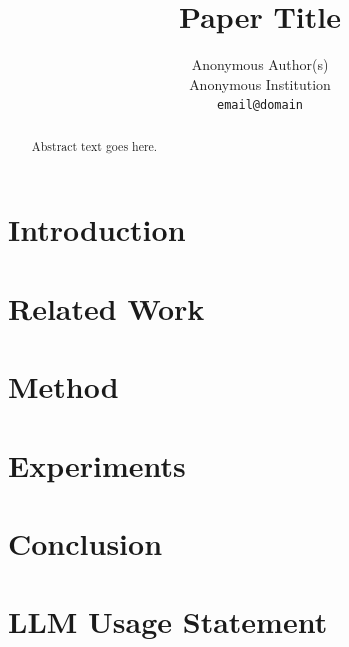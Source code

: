 \documentclass[10pt,twocolumn,letterpaper]{article}
\title{Paper Title}
\author{Anonymous Author(s)\\
Anonymous Institution\\
{\tt\small email@domain}
}
\begin{document}
\maketitle

\begin{abstract}
Abstract text goes here.
\end{abstract}

\section{Introduction}

\section{Related Work}

\section{Method}

\section{Experiments}

\section{Conclusion}

\section*{LLM Usage Statement}

{\small


}
\end{document}
